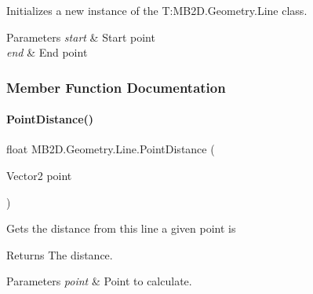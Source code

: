 Initializes a new instance of the T\+:\+M\+B2\+D.\+Geometry.\+Line class. 


\begin{DoxyParams}{Parameters}
{\em start} & Start point\\
\hline
{\em end} & End point\\
\hline
\end{DoxyParams}


\subsubsection{Member Function Documentation}
\hypertarget{class_m_b2_d_1_1_geometry_1_1_line_ae5d02b1abab30bf1c8f471df2061749f}{}\label{class_m_b2_d_1_1_geometry_1_1_line_ae5d02b1abab30bf1c8f471df2061749f} 
\paragraph{\texorpdfstring{Point\+Distance()}{PointDistance()}\hspace{0.1cm}{\footnotesize\ttfamily [1/2]}}
{\footnotesize\ttfamily float M\+B2\+D.\+Geometry.\+Line.\+Point\+Distance (\begin{DoxyParamCaption}\item[{Vector2}]{point }\end{DoxyParamCaption})\hspace{0.3cm}{\ttfamily [inline]}}



Gets the distance from this line a given point is 

\begin{DoxyReturn}{Returns}
The distance.
\end{DoxyReturn}

\begin{DoxyParams}{Parameters}
{\em point} & Point to calculate.\\
\hline
\end{DoxyParams}
\hypertarget{class_m_b2_d_1_1_geometry_1_1_line_a5cbeb68ba1f9f2c8a191f4593a234fa8}{}\label{class_m_b2_d_1_1_geometry_1_1_line_a5cbeb68ba1f9f2c8a191f4593a234fa8} 
